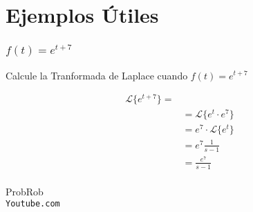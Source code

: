 \documentclass[12pt]{report}                                %
\begin{document}
    \clearpage
    \section{Ejemplos Útiles}

        \subsubsection{$f(t) = e^{t+7}$}
            Calcule la Tranformada de Laplace cuando $f(t) = e^{t+7}$

            \begin{equation*}   
            \begin{split}
                \mathscr{L}\{e^{t+7}\}  =                                                       \\
                            & = \mathscr{L} \{ e^t \cdot e^7 \}                                 \\
                            & = e^7 \cdot \mathscr{L} \{ e^t \}                                 \\
                            & = e^7 \frac{1}{s-1}                                               \\
                            & = \frac{e^7}{s-1}                                                 \\
            \end{split}
            \end{equation*}



\clearpage

	\begin{thebibliography}{9}

		ProbRob
		\\\texttt{Youtube.com}


	 

\end{thebibliography}
\end{document}

